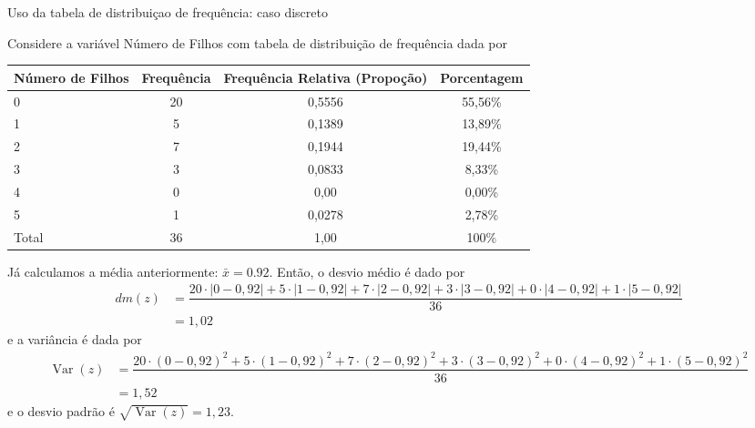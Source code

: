 \documentclass[8pt]{beamer}
\DeclareMathOperator{\vari}{Var}
\begin{document}
\begin{frame}{Uso da tabela de distribuiçao de frequência: caso discreto}

{\tiny
Considere a variável Número de Filhos com tabela de distribuição de frequência dada por


 \begin{table}
  \centering
  \begin{tabular}{l|ccc}
    \toprule[0.05cm]
    Número de Filhos & Frequência & Frequência Relativa (Propoção) & Porcentagem\\
    \midrule[0.05cm]
    0 & 20 & 0,5556 & 55,56\% \\
    1 & 5 & 0,1389 & 13,89\% \\
    2 & 7 & 0,1944 & 19,44\% \\
    3 & 3 & 0,0833 & 8,33\% \\
    4 & 0 & 0,00 & 0,00\% \\
    5 & 1 & 0,0278 & 2,78\% \\ \midrule[0,05cm]
    Total & 36 & 1,00 & 100\% \\ \bottomrule[0,05cm]
  \end{tabular}
 \end{table}

 Já calculamos a média anteriormente: $\bar{x} = 0.92$.
 Então, o desvio médio é dado por
 \begin{align*}
  dm(z) &= \dfrac{20\cdot \left\vert0-0,92\right\vert+5\cdot \left\vert1-0,92\right\vert+7\cdot \left\vert2-0,92\right\vert+3\cdot \left\vert3-0,92\right\vert+0\cdot \left\vert4-0,92\right\vert+1\cdot \left\vert5-0,92\right\vert}{36}\\
  &= 1,02
 \end{align*}
 e a variância é dada por
 \begin{align*}
  \vari(z) &= \dfrac{20\cdot (0-0,92)^2+5\cdot (1-0,92)^2+7\cdot (2-0,92)^2+3\cdot (3-0,92)^2+0\cdot (4-0,92)^2+1\cdot (5-0,92)^2}{36}\\
  &= 1,52
 \end{align*}
  e o desvio padrão é $\sqrt{\vari(z)} = 1,23$.
}
\end{frame}
\end{document}

